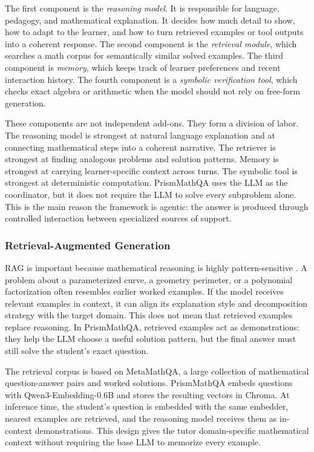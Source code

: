 The first component is the \emph{reasoning model}. It is responsible for language, pedagogy, and mathematical explanation. It decides how much detail to show, how to adapt to the learner, and how to turn retrieved examples or tool outputs into a coherent response. The second component is the \emph{retrieval module}, which searches a math corpus for semantically similar solved examples. The third component is \emph{memory}, which keeps track of learner preferences and recent interaction history. The fourth component is a \emph{symbolic verification tool}, which checks exact algebra or arithmetic when the model should not rely on free-form generation.

These components are not independent add-ons. They form a division of labor. The reasoning model is strongest at natural language explanation and at connecting mathematical steps into a coherent narrative. The retriever is strongest at finding analogous problems and solution patterns. Memory is strongest at carrying learner-specific context across turns. The symbolic tool is strongest at deterministic computation. PrismMathQA uses the LLM as the coordinator, but it does not require the LLM to solve every subproblem alone. This is the main reason the framework is agentic: the answer is produced through controlled interaction between specialized sources of support.

\subsubsection{Retrieval-Augmented Generation}

RAG is important because mathematical reasoning is highly pattern-sensitive \citep{lewis2020rag}. A problem about a parameterized curve, a geometry perimeter, or a polynomial factorization often resembles earlier worked examples. If the model receives relevant examples in context, it can align its explanation style and decomposition strategy with the target domain. This does not mean that retrieved examples replace reasoning. In PrismMathQA, retrieved examples act as demonstrations: they help the LLM choose a useful solution pattern, but the final answer must still solve the student's exact question.

The retrieval corpus is based on MetaMathQA, a large collection of mathematical question-answer pairs and worked solutions. PrismMathQA embeds questions with Qwen3-Embedding-0.6B and stores the resulting vectors in Chroma. At inference time, the student's question is embedded with the same embedder, nearest examples are retrieved, and the reasoning model receives them as in-context demonstrations. This design gives the tutor domain-specific mathematical context without requiring the base LLM to memorize every example.

